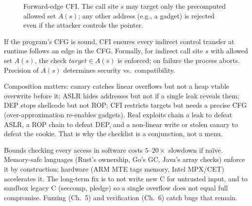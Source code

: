 \begin{figure}[h]\centering
{}
\caption{Forward-edge CFI. The call site $s$ may target only the precomputed allowed set $A(s)$; any other address (e.g., a gadget) is rejected even if the attacker controls the pointer.}
\label{fig:cfi}
\end{figure}

\begin{definition}
If the program's CFG is sound, CFI ensures every indirect control transfer at runtime follows an edge in the CFG. Formally, for indirect call site $s$ with allowed set $A(s)$, the check $target\in A(s)$ is enforced; on failure the process aborts. Precision of $A(s)$ determines security vs.\ compatibility.
\end{definition}

Composition matters: canary catches linear overflows but not a heap vtable overwrite before it; ASLR hides addresses but not if a single leak reveals them; DEP stops shellcode but not ROP; CFI restricts targets but needs a precise CFG (over-approximation re-enables gadgets). Real exploits chain a leak to defeat ASLR, a ROP chain to defeat DEP, and a non-linear write or stolen canary to defeat the cookie. That is why the checklist is a conjunction, not a menu.

\begin{remark}
Bounds checking every access in software costs $5$--$20\times$ slowdown if naïve. Memory-safe languages (Rust's ownership, Go's GC, Java's array checks) enforce it by construction; hardware (ARM MTE tags memory, Intel MPX/CET) accelerates it. The long-term fix is to not write new C for untrusted input, and to sandbox legacy C (seccomp, pledge) so a single overflow does not equal full compromise. Fuzzing (Ch.~5) and verification (Ch.~6) catch bugs that remain.
\end{remark}


